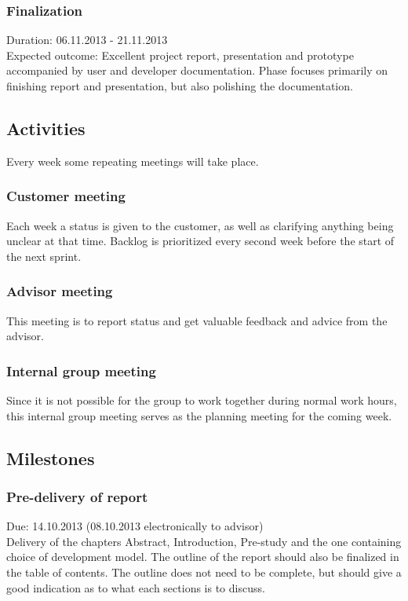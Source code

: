 \documentclass[11pt]{book}
\begin{document}
\subsubsection{Finalization}
Duration: 06.11.2013 - 21.11.2013\\
Expected outcome: Excellent project report, presentation and prototype accompanied by user and developer documentation. Phase focuses primarily on finishing report and presentation, but also polishing the documentation.

\subsection{Activities}
Every week some repeating meetings will take place.

\subsubsection{Customer meeting}
Each week a status is given to the customer, as well as clarifying anything being unclear at that time. Backlog is prioritized every second week before the start of the next sprint.

\subsubsection{Advisor meeting}
This meeting is to report status and get valuable feedback and advice from the advisor.

\subsubsection{Internal group meeting}
Since it is not possible for the group to work together during normal work hours, this internal group meeting serves as the planning meeting for the coming week.

\subsection{Milestones}

\subsubsection{Pre-delivery of report}
Due: 14.10.2013 (08.10.2013 electronically to advisor)\\
Delivery of the chapters Abstract, Introduction, Pre-study and the one containing choice of development model. The outline of the report should also be finalized in the table of contents. The outline does not need to be complete, but should give a good indication as to what each sections is to discuss.
\end{document}
